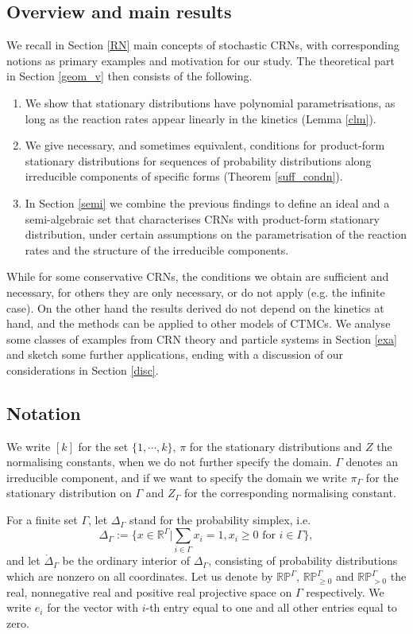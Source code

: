 \documentclass{amsart}
\theoremstyle{definition}
\theoremstyle{remark}
\theoremstyle{Conjecture/open problem}
\theoremstyle{assumption}
\theoremstyle{conjecture}
\def\Pr{\mathbb{P}}
\def\Ga{\Gamma}
\def\R{\mathbb{R}}
\numberwithin{equation}{section}
\begin{document}
\subsection{Overview and main results}
 We recall in Section \ref{RN} main concepts of stochastic CRNs, with corresponding notions as primary examples and motivation for our study. The theoretical part in Section \ref{geom_v} then consists of the following.
\begin{enumerate}
\item We show that stationary distributions have polynomial parametrisations, as long as the reaction rates appear linearly in the kinetics (Lemma \ref{clm}).
\item We give necessary, and sometimes equivalent, conditions for product-form stationary distributions for sequences of probability distributions along irreducible components of specific forms (Theorem \ref{suff_condn}).
\item In Section \ref{semi} we combine the previous findings to define an ideal and a semi-algebraic set that characterises CRNs with product-form stationary distribution, under certain assumptions on the parametrisation of the reaction rates and the structure of the irreducible components.
\end{enumerate}
While for some conservative CRNs, the conditions we obtain are sufficient and necessary, for others they are only necessary, or do not apply (e.g. the infinite case). On the other hand the results derived do not depend on the kinetics at hand, and the methods can be applied to other models of CTMCs. 
We analyse some classes of examples from CRN theory and particle systems in Section \ref{exa} and sketch some further applications, ending with a discussion of our considerations in Section \ref{disc}.



\subsection{Notation}
We write $[k]$ for the set $\{1,\cdots , k\}$, $\pi$ for the stationary distributions and $Z$ the normalising constants, when we do not further specify the domain. $\Ga$ denotes an irreducible component, and if we want to specify the domain we write $\pi_\Ga$ for the stationary distribution on $\Ga$ and $Z_\Ga$ for the corresponding normalising constant.


For a finite set $\Ga$, 
let $\Delta_{\Ga}$ stand for the probability simplex, i.e.
$$\Delta_{\Ga}:=\{x\in \R^\Ga| \sum_{i\in\Ga}x_i=1,x_i\geq 0 \text{ for }i\in\Ga\}, $$
and let $\mathring \Delta_{\Ga}$ be the ordinary interior of $\Delta_{\Ga}$, consisting of probability distributions which are nonzero on all coordinates.
Let us denote by $\R\Pr^{\Ga}$, $\R\Pr^{\Ga}_{\geq 0}$ and $\R\Pr^{\Ga}_{> 0}$ the 
real, nonnegative real and positive real projective space on $\Ga$ respectively.
We write $e_i$ for the vector with $i$-th entry equal to one and all other entries equal to zero.
\end{document}
